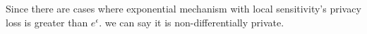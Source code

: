 Since there are cases where exponential mechanism with local sensitivity's privacy loss is greater than $e^{\epsilon}$. we can say it is non-differentially private.


